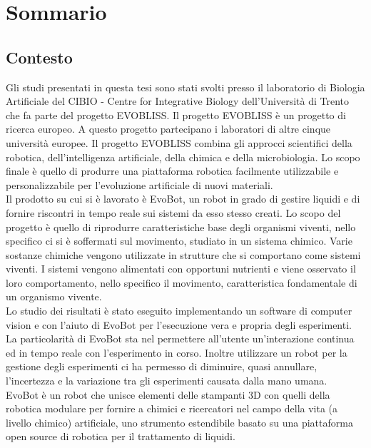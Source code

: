 \chapter*{Sommario} %
\label{sommario}
\section{Contesto}
Gli studi presentati in questa tesi sono stati svolti presso il laboratorio di Biologia Artificiale del CIBIO - Centre for Integrative Biology dell'Università di Trento che fa parte del progetto EVOBLISS. Il progetto EVOBLISS  è un progetto di ricerca europeo. A questo progetto partecipano i laboratori di altre cinque università europee. Il progetto EVOBLISS combina gli approcci scientifici della robotica, dell'intelligenza artificiale, della chimica e della microbiologia. Lo scopo finale è quello di produrre una piattaforma robotica facilmente utilizzabile e personalizzabile per l'evoluzione artificiale di nuovi materiali. 
\\Il prodotto su cui si è lavorato è EvoBot, un robot in grado di gestire liquidi e di fornire riscontri in tempo reale sui sistemi da esso stesso creati. Lo scopo del progetto è quello di riprodurre caratteristiche base degli organismi viventi, nello specifico ci si è soffermati sul movimento, studiato in un sistema chimico. Varie sostanze chimiche vengono utilizzate in strutture che si comportano come sistemi viventi. I sistemi vengono alimentati con opportuni nutrienti e viene osservato il loro comportamento, nello specifico il movimento, caratteristica fondamentale di un organismo vivente. 
\\Lo studio dei risultati è stato eseguito implementando un software di computer vision e con l'aiuto di EvoBot per l'esecuzione vera e propria degli esperimenti. La particolarità di EvoBot sta nel permettere all'utente un'interazione continua ed in tempo reale con l'esperimento in corso.\cite{introd-robot} Inoltre utilizzare un robot per la gestione degli esperimenti ci ha permesso di diminuire, quasi annullare, l'incertezza e la variazione tra gli esperimenti causata dalla mano umana. 
\\EvoBot è un robot che unisce elementi delle stampanti 3D con quelli della robotica modulare per fornire a chimici e ricercatori nel campo della vita (a livello chimico) artificiale, uno strumento estendibile basato su una piattaforma open source di robotica per il trattamento di liquidi.
